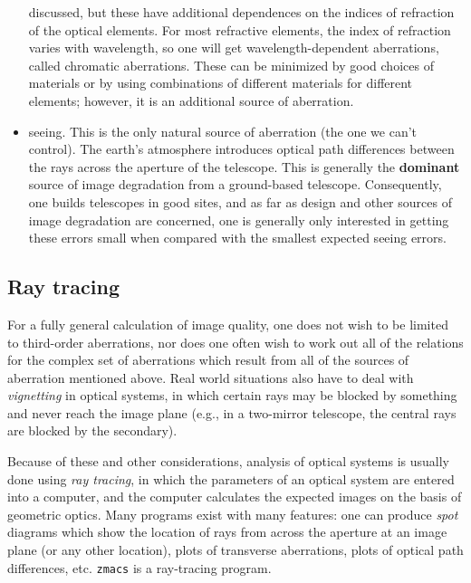 \documentclass[12pt]{article}
\begin{document}
\begin{itemize}
        discussed, but these have additional dependences on the indices of
        refraction of the optical elements. For most refractive elements, the
        index of refraction varies with wavelength, so one will get
        wavelength-dependent aberrations, called chromatic aberrations. These
        can be minimized by good choices of materials or by using combinations
        of different materials for different elements; however, it is an
        additional source of aberration.
    \item seeing. This is the only natural source of aberration (the one
        we can't control).
        The earth's atmosphere introduces optical path differences
        between the rays across the aperture of the telescope. This is
        generally the \textbf{dominant} source of image degradation from a ground-based
        telescope. Consequently, one builds telescopes in good sites, and as
        far as design and other sources of image degradation are concerned,
        one is generally only interested in getting these errors small when
        compared with the smallest expected seeing errors.
\end{itemize}

\subsection{Ray tracing}

For a fully general calculation of image quality, one does not wish
to be limited to third-order aberrations, nor does one often wish to
work out all of the relations for the complex set of aberrations
which result from all of the sources of aberration mentioned above.
Real world situations also have to deal with \emph{vignetting} in optical
systems, in which certain rays may be blocked by something and never
reach the image plane (e.g., in a two-mirror telescope, the central
rays are blocked by the secondary).

Because of these and other considerations, analysis of optical
systems is usually done using \emph{ray tracing}, in which the parameters of
an optical system are entered into a computer, and the computer
calculates the expected images on the basis of geometric optics. Many
programs exist with many features: one can produce \emph{spot} diagrams
which show the location of rays from across the aperture at an image
plane (or any other location), plots of transverse aberrations, plots
of optical path differences, etc. \texttt{zmacs} is a ray-tracing
program.
\end{document}

